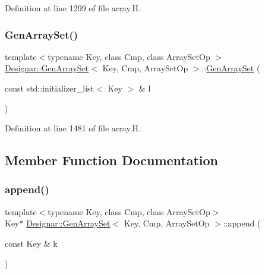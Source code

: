 Definition at line 1299 of file array.\+H.

\mbox{\label{class_designar_1_1_gen_array_set_a53cc511f4539c16b1542f56979433c2a}} 
\subsubsection{\texorpdfstring{Gen\+Array\+Set()}{GenArraySet()}\hspace{0.1cm}{\footnotesize\ttfamily [6/6]}}
{\footnotesize\ttfamily template$<$typename Key, class Cmp, class Array\+Set\+Op $>$ \\
\hyperlink{class_designar_1_1_gen_array_set}{Designar\+::\+Gen\+Array\+Set}$<$ Key, Cmp, Array\+Set\+Op $>$\+::\hyperlink{class_designar_1_1_gen_array_set}{Gen\+Array\+Set} (\begin{DoxyParamCaption}\item[{const std\+::initializer\+\_\+list$<$ Key $>$ \&}]{l }\end{DoxyParamCaption})}



Definition at line 1481 of file array.\+H.



\subsection{Member Function Documentation}
\mbox{\label{class_designar_1_1_gen_array_set_ac1367b0dd7bc3f90fc73101991dc398a}} 
\subsubsection{\texorpdfstring{append()}{append()}\hspace{0.1cm}{\footnotesize\ttfamily [1/2]}}
{\footnotesize\ttfamily template$<$typename Key, class Cmp, class Array\+Set\+Op$>$ \\
Key$\ast$ \hyperlink{class_designar_1_1_gen_array_set}{Designar\+::\+Gen\+Array\+Set}$<$ Key, Cmp, Array\+Set\+Op $>$\+::append (\begin{DoxyParamCaption}\item[{const Key \&}]{k }\end{DoxyParamCaption})\hspace{0.3cm}{\ttfamily [inline]}}



